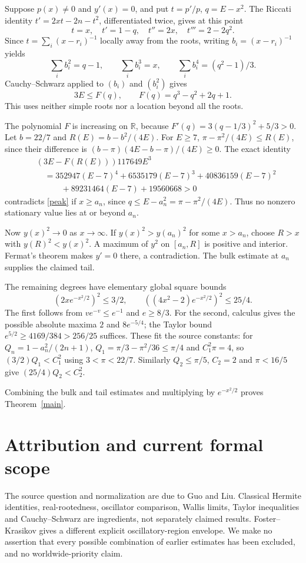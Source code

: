 \documentclass[11pt]{article}
\begin{document}
Suppose $p(x)\ne0$ and $y'(x)=0$, and put $t=p'/p$, $q=E-x^2$. The Riccati identity $t'=2xt-2n-t^2$, differentiated twice, gives at this point
\[
 t=x,\quad t'=1-q,\quad t''=2x,\quad t'''=2-2q^2.
\]
Since $t=\sum_i(x-r_i)^{-1}$ locally away from the roots, writing $b_i=(x-r_i)^{-1}$ yields
\[
 \sum_i b_i^2=q-1,\qquad \sum_i b_i^3=x,\qquad
 \sum_i b_i^4=(q^2-1)/3.
\]
Cauchy--Schwarz applied to $(b_i)$ and $(b_i^2)$ gives
\begin{equation}\label{peak}
 3E\leq F(q),\qquad F(q)=q^3-q^2+2q+1.
\end{equation}
This uses neither simple roots nor a location beyond all the roots.

The polynomial $F$ is increasing on $\mathbb R$, because
$F'(q)=3(q-1/3)^2+5/3>0$. Let $b=22/7$ and $R(E)=b-b^2/(4E)$. For $E\geq7$,
$\pi-\pi^2/(4E)\leq R(E)$, since their difference is
$(b-\pi)(4E-b-\pi)/(4E)\geq0$. The exact identity
\begin{align*}
 &(3E-F(R(E)))117649E^3\\
 &\quad=352947(E-7)^4+6535179(E-7)^3+40836159(E-7)^2\\
 &\qquad\quad+89231464(E-7)+19560668>0
\end{align*}
contradicts \eqref{peak} if $x\geq a_n$, since $q\leq E-a_n^2=\pi-\pi^2/(4E)$. Thus no nonzero stationary value lies at or beyond $a_n$.

Now $y(x)^2\to0$ as $x\to\infty$. If $y(x)^2>y(a_n)^2$ for some $x>a_n$, choose $R>x$ with $y(R)^2<y(x)^2$. A maximum of $y^2$ on $[a_n,R]$ is positive and interior. Fermat's theorem makes $y'=0$ there, a contradiction. The bulk estimate at $a_n$ supplies the claimed tail.

The remaining degrees have elementary global square bounds
\[
 (2xe^{-x^2/2})^2\leq3/2,\qquad ((4x^2-2)e^{-x^2/2})^2\leq25/4.
\]
The first follows from $ve^{-v}\leq e^{-1}$ and $e\geq8/3$. For the second, calculus gives the possible absolute maxima $2$ and $8e^{-5/4}$; the Taylor bound $e^{5/2}\geq4169/384>256/25$ suffices. These fit the source constants: for $Q_n=1-a_n^2/(2n+1)$, $Q_1=\pi/3-\pi^2/36\leq\pi/4$ and $C_1^2\pi=4$, so $(3/2)Q_1<C_1^2$ using $3<\pi<22/7$. Similarly $Q_2\leq\pi/5$, $C_2=2$ and $\pi<16/5$ give $(25/4)Q_2<C_2^2$.

Combining the bulk and tail estimates and multiplying by $e^{-x^2/2}$ proves Theorem~\ref{main}.

\section*{Attribution and current formal scope}
The source question and normalization are due to Guo and Liu. Classical Hermite identities, real-rootedness, oscillator comparison, Wallis limits, Taylor inequalities and Cauchy--Schwarz are ingredients, not separately claimed results. Foster--Krasikov \cite{FK} gives a different explicit oscillatory-region envelope. We make no assertion that every possible combination of earlier estimates has been excluded, and no worldwide-priority claim.
\end{document}
